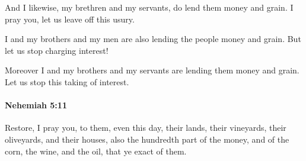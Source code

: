 			\begin{versebox}
					\item[BHS] 
					\item[LXX] 
					\item[ASV] And I likewise, my brethren and my servants, do lend them money and grain. I pray you, let us leave off this usury.
					\item[NIV] I and my brothers and my men are also lending the people money and grain. But let us stop charging interest!
					\item[NRSV] Moreover I and my brothers and my servants are lending them money and grain. Let us stop this taking of interest.
			\end{versebox}

		\paragraph{Nehemiah 5:11} %
			\label{NEHEMIAH-5-11}

			Restore, I pray you, to them, even this day, their lands, their vineyards, their oliveyards, and their houses, also the hundredth part of the money, and of the corn, the wine, and the oil, that ye exact of them.


